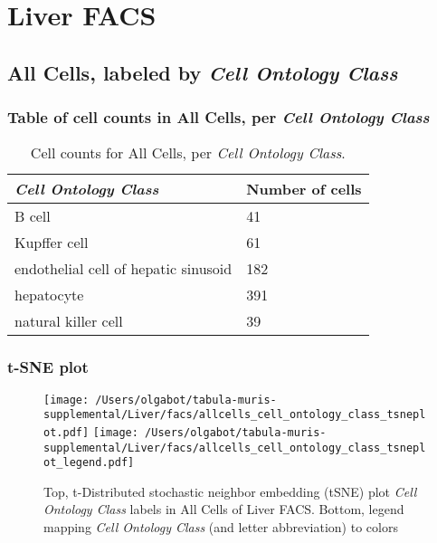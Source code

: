 \clearpage
\section{Liver FACS}

\subsection{All Cells, labeled by \emph{Cell Ontology Class}}
\subsubsection{Table of cell counts in All Cells, per \emph{Cell Ontology Class}}\begin{table}[h]
\centering
\label{my-label}
\begin{tabular}{@{}ll@{}}
\toprule

\emph{Cell Ontology Class}& Number of cells \\ \midrule
B cell & 41 \\

Kupffer cell & 61 \\

endothelial cell of hepatic sinusoid & 182 \\

hepatocyte & 391 \\

natural killer cell & 39 \\
\bottomrule
\end{tabular}
\caption{Cell counts for All Cells, per \emph{Cell Ontology Class}.}
\end{table}

\clearpage
\subsubsection{t-SNE plot}
\begin{figure}[h]
\centering
\texttt{[image: /Users/olgabot/tabula-muris-supplemental/Liver/facs/allcells\_cell\_ontology\_class\_tsneplot.pdf]}
\texttt{[image: /Users/olgabot/tabula-muris-supplemental/Liver/facs/allcells\_cell\_ontology\_class\_tsneplot\_legend.pdf]}
\caption{Top, t-Distributed stochastic neighbor embedding (tSNE) plot  \emph{Cell Ontology Class} labels in All Cells of Liver FACS. Bottom, legend mapping \emph{Cell Ontology Class} (and letter abbreviation) to colors}
\end{figure}


\clearpage

